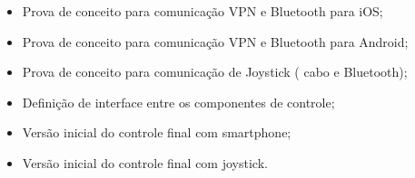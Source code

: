 \begin{itemize}
 \item Prova de conceito para comunicação VPN e Bluetooth para iOS;
 \item Prova de conceito para comunicação VPN e Bluetooth para Android;
 \item Prova de conceito para comunicação de Joystick ( cabo e Bluetooth);
 \item Definição de interface entre os componentes de controle;
 \item Versão inicial do controle final com smartphone;
 \item Versão inicial do controle final com joystick.
\end{itemize}

